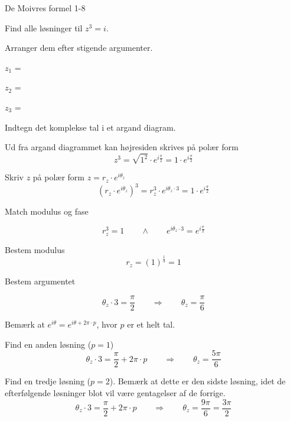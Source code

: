 \documentclass{article}
\begin{document}
\begin{exercise}{De Moivres formel 1-8}

Find alle løsninger til $z^3=i$. 

Arranger dem efter stigende argumenter.

$z_1$ = 		

$z_2$ = 		

$z_3$ = 		


\hint 

Indtegn det komplekse tal i et argand diagram. 

\hint 

Ud fra argand diagrammet kan højresiden skrives på polær form
\[
z^3 = \sqrt{1^2} \cdot e^{i \frac{\pi}{2}} = 1 \cdot e^{i \frac{\pi}{2}} 
\]


\hint

Skriv $z$ på polær form $z = r_z \cdot e^{i \theta_z}$
\[
\left(r_z \cdot e^{i \theta_z}\right)^3 = r_z^3 \cdot e^{i \theta_z \cdot 3} = 1 \cdot e^{i \frac{\pi}{2}} 
\]

\hint 
Match modulus og fase

\[
r_z^3 = 1 \qquad \wedge \qquad e^{i \theta_z \cdot 3} = e^{i \frac{\pi}{2}} 
\]

\hint

Bestem modulus
\[
r_z  =  \left(1 \right)^{\frac{1}{3}} = 1
\]

\hint

Bestem argumentet

\[
\theta_z \cdot 3 = \frac{\pi}{2} \qquad \Rightarrow \qquad  \theta_z = \frac{\pi}{6}
\]

\hint

Bemærk at $e^{i \theta} = e^{i \theta + 2 \pi \cdot p}$, hvor $p$ er et helt tal.

\hint

Find en anden løsning ($p=1$)
\[
\theta_z \cdot 3 = \frac{\pi}{2}  + 2 \pi \cdot p \qquad \Rightarrow \qquad  \theta_z = \frac{5 \pi}{6}
\]

\hint

Find en tredje løsning ($p=2$). 
Bemærk at dette er den sidste løsning, idet de efterfølgende 
løsninger blot vil være gentagelser af de forrige.
\[
\theta_z \cdot 3 =  \frac{\pi}{2}  + 2 \pi \cdot p \qquad \Rightarrow  \qquad  \theta_z = \frac{9 \pi}{6} = \frac{3 \pi}{2}
\]


\end{exercise}

\newpage
\end{document}
